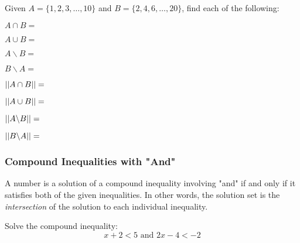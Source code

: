 \newpage
\begin{example}
Given $A = \{1,2,3,\dots,10\}$ and $B = \{2,4,6,\dots,20\}$, find each of the following:
\begin{enumerate}
\begin{minipage}{.5\textwidth}

\item $A \cap B = $
\vspace{.35in}
\item $A \cup B = $
\vspace{.35in}
\item $A\backslash B = $
\vspace{.35in}
\item $B\backslash A = $
\vspace{.35in}
\end{minipage}%
\begin{minipage}{.5\textwidth}
\item $\abs{\abs{A \cap B}} = $
\vspace{.35in}
\item $\abs{\abs{A \cup B }}= $
\vspace{.35in}
\item $\abs{\abs{A\backslash B}} = $
\vspace{.35in}
\item $\abs{\abs{B\backslash A}} = $
\vspace{.35in}

\end{minipage}%
\end{enumerate}
\end{example}

\vspace{.2in}

\subsubsection*{Compound Inequalities with "And"}

A number is a solution of a compound inequality involving "and" if and only if it satisfies both of the given inequalities. In other words, the solution set is the \emph{intersection} of the solution to each individual inequality.

\begin{example}
Solve the compound inequality:
\[x + 2 < 5 \text{ and } 2x-4 <-2\]
\vspace{2in}
\end{example}

\newpage

